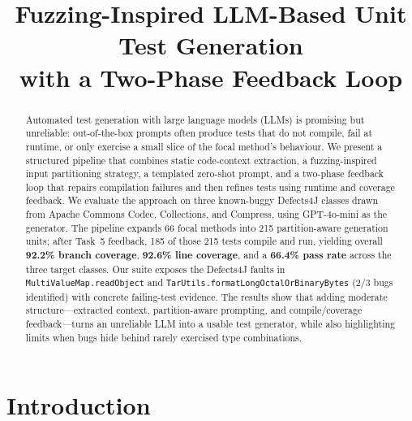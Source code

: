 \documentclass[conference]{IEEEtran}
\begin{document}
\title{Fuzzing-Inspired LLM-Based Unit Test Generation\\ with a Two-Phase Feedback Loop}

\author{
}

\maketitle

\begin{abstract}
Automated test generation with large language models (LLMs) is promising
but unreliable: out-of-the-box prompts often produce tests that do not
compile, fail at runtime, or only exercise a small slice of the focal
method's behaviour. We present a structured pipeline that combines
static code-context extraction, a fuzzing-inspired input partitioning
strategy, a templated zero-shot prompt, and a two-phase feedback loop
that repairs compilation failures and then refines tests using runtime
and coverage feedback. We evaluate the approach on three known-buggy
Defects4J classes drawn from Apache Commons Codec, Collections, and
Compress, using GPT-4o-mini as the generator. The pipeline expands
66 focal methods into 215 partition-aware generation units; after
Task~5 feedback, 185 of those 215 tests compile and run, yielding
overall \textbf{92.2\% branch coverage},
\textbf{92.6\% line coverage}, and a \textbf{66.4\% pass rate}
across the three target classes. Our suite exposes the Defects4J
faults in
\texttt{MultiValueMap.readObject} and
\texttt{TarUtils.formatLongOctalOrBinaryBytes} (2/3 bugs identified)
with concrete failing-test evidence. The results show that adding
moderate structure---extracted context, partition-aware prompting, and
compile/coverage feedback---turns an unreliable LLM into a usable test
generator, while also highlighting limits when bugs hide behind rarely
exercised type combinations.
\end{abstract}

\section{Introduction}
\end{document}
